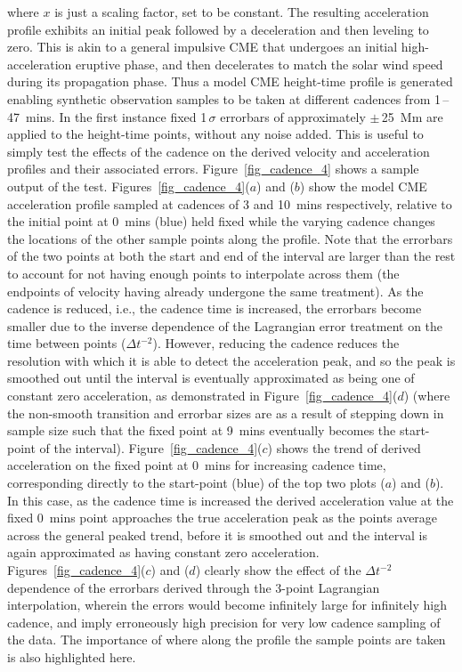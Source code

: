 \documentclass[preprint2]{aastex}
\begin{document}
where $x$ is just a scaling factor, set to be constant. The resulting acceleration profile exhibits an initial peak followed by a deceleration and then leveling to zero. This is akin to a general impulsive CME that undergoes an initial high-acceleration eruptive phase, and then decelerates to match the solar wind speed during its propagation phase. Thus a model CME height-time profile is generated enabling synthetic observation samples to be taken at different cadences from 1\,--\,47~mins. In the first instance fixed 1\,$\sigma$ errorbars of approximately $\pm$\,25~Mm are applied to the height-time points, without any noise added. This is useful to simply test the effects of the cadence on the derived velocity and acceleration profiles and their associated errors. Figure~\ref{fig_cadence_4} shows a sample output of the test. Figures~\ref{fig_cadence_4}($a$) and ($b$) show the model CME acceleration profile sampled at cadences of 3 and 10~mins respectively, relative to the initial point at 0~mins (blue) held fixed while the varying cadence changes the locations of the other sample points along the profile. Note that the errorbars of the two points at both the start and end of the interval are larger than the rest to account for not having enough points to interpolate across them (the endpoints of velocity having already undergone the same treatment). As the cadence is reduced, i.e., the cadence time is increased, the errorbars become smaller due to the inverse dependence of the Lagrangian error treatment on the time between points ($\Delta t^{-2}$). However, reducing the cadence reduces the resolution with which it is able to detect the acceleration peak, and so the peak is smoothed out until the interval is eventually approximated as being one of constant zero acceleration, as demonstrated in Figure~\ref{fig_cadence_4}($d$) (where the non-smooth transition and errorbar sizes are as a result of stepping down in sample size such that the fixed point at 9~mins eventually becomes the start-point of the interval). Figure~\ref{fig_cadence_4}($c$) shows the trend of derived acceleration on the fixed point at 0~mins for increasing cadence time, corresponding directly to the start-point (blue) of the top two plots ($a$) and ($b$). In this case, as the cadence time is increased the derived acceleration value at the fixed 0~mins point approaches the true acceleration peak as the points average across the general peaked trend, before it is smoothed out and the interval is again approximated as having constant zero acceleration. Figures~\ref{fig_cadence_4}($c$) and ($d$) clearly show the effect of the $\Delta t^{-2}$ dependence of the errorbars derived through the 3-point Lagrangian interpolation, wherein the errors would become infinitely large for infinitely high cadence, and imply erroneously high precision for very low cadence sampling of the data. The importance of where along the profile the sample points are taken is also highlighted here.
\end{document}
